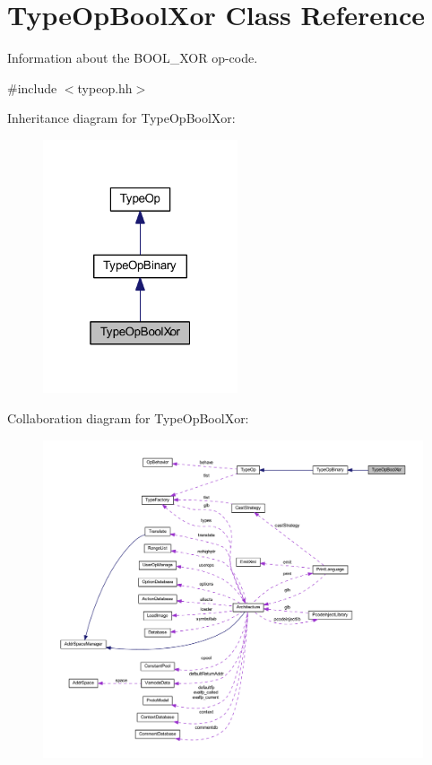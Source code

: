 \hypertarget{class_type_op_bool_xor}{}\section{Type\+Op\+Bool\+Xor Class Reference}
\label{class_type_op_bool_xor}


Information about the B\+O\+O\+L\+\_\+\+X\+OR op-\/code.  




{\ttfamily \#include $<$typeop.\+hh$>$}



Inheritance diagram for Type\+Op\+Bool\+Xor\+:
\nopagebreak
\begin{figure}[H]
\begin{center}
\leavevmode
\includegraphics[width=163pt]{class_type_op_bool_xor__inherit__graph}
\end{center}
\end{figure}


Collaboration diagram for Type\+Op\+Bool\+Xor\+:
\nopagebreak
\begin{figure}[H]
\begin{center}
\leavevmode
\includegraphics[width=350pt]{class_type_op_bool_xor__coll__graph}
\end{center}
\end{figure}
